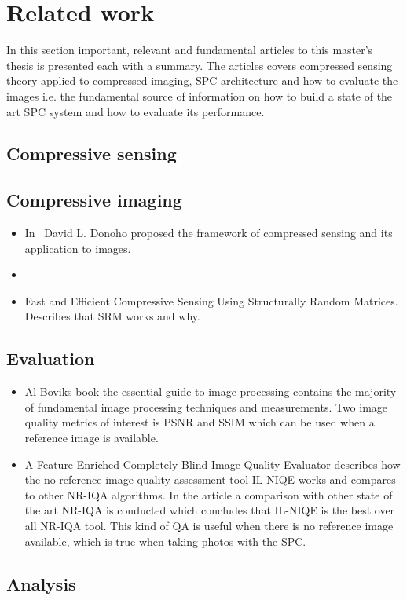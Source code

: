 \section{Related work}
In this section important, relevant and fundamental articles to this master's thesis is presented each with a summary. The articles covers compressed sensing theory applied to compressed imaging, SPC architecture and how to evaluate the images i.e. the fundamental source of information on how to build a state of the art SPC system and how to evaluate its performance. 

\subsection{Compressive sensing}


\subsection{Compressive imaging}
\begin{itemize}

    \item In~\cite{article:CS_donoho1} David L. Donoho proposed the framework of compressed sensing and its application to images.
    
    \item 

    \item \cite{article:SRM} Fast and Efficient Compressive Sensing Using Structurally Random Matrices. Describes that SRM works and why.

\end{itemize}


\subsection{Evaluation}

\begin{itemize}

    \item Al Boviks book the essential guide to image processing \cite{book:image_processing} contains the majority of fundamental image processing techniques and measurements. Two image quality metrics of interest is PSNR and SSIM which can be used when a reference image is available.
    
    \item \cite{article:il_niqe} A Feature-Enriched Completely Blind Image
    Quality Evaluator describes how the no reference image quality assessment tool IL-NIQE works and compares to other NR-IQA algorithms. In the article a comparison with other state of the art NR-IQA is conducted which concludes that IL-NIQE is the best over all NR-IQA tool. This kind of QA is useful when there is no reference image available, which is true when taking photos with the SPC.
    
    
    
\end{itemize}


\subsection{Analysis}